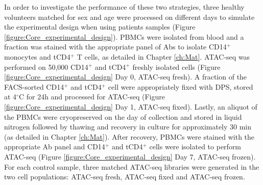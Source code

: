 In order to investigate the performance of these two strategies, three healthy volunteers  matched for sex and age were processed on different days to simulate the experimental design when using patients samples (Figure \ref{figure:Core_experimental_design}). PBMCs were isolated from blood and a fraction was stained with the appropriate panel of Abs to isolate CD14$^+$ monocytes and tCD4$^+$ T cells, as detailed in Chapter \ref{ch:Mat}. ATAC-seq was performed on 50,000 CD14$^+$ and tCD4$^+$ freshly isolated cells (Figure \ref{figure:Core_experimental_design} Day 0, ATAC-seq fresh). A fraction of the FACS-sorted CD14$^+$ and tCD4$^+$ cell were appropriately fixed with DPS, stored at 4{$^\circ$}C for 24h and processed for ATAC-seq (Figure \ref{figure:Core_experimental_design} Day 1, ATAC-seq fixed). Lastly, an aliquot of the PBMCs were cryopreserved on the day of collection and stored in liquid nitrogen followed by thawing and recovery in culture for approximately 30 min (as detailed in Chapter \ref{ch:Mat}). After recovery, PBMCs were stained with the appropriate Ab panel and CD14$^+$ and tCD4$^+$ cells were isolated to perform ATAC-seq (Figure \ref{figure:Core_experimental_design} Day 7, ATAC-seq frozen). For each control sample, three matched ATAC-seq libraries were generated in the two cell populations: ATAC-seq fresh, ATAC-seq fixed and ATAC-seq frozen.

